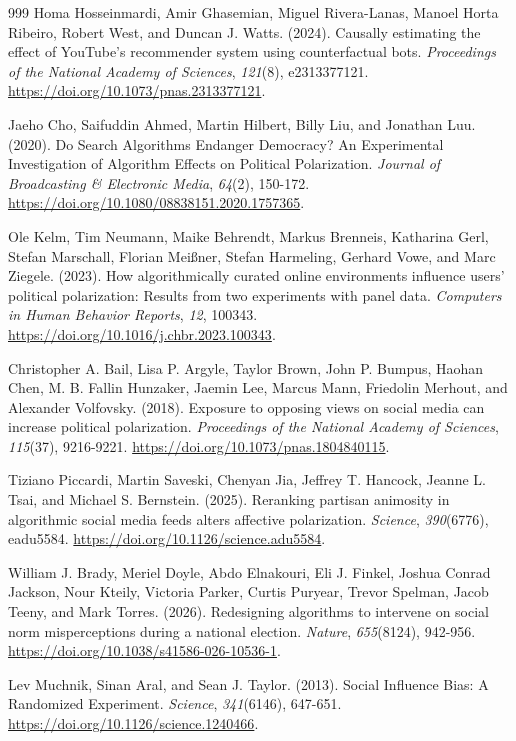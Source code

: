 \begin{thebibliography}{999}
Homa Hosseinmardi, Amir Ghasemian, Miguel Rivera-Lanas, Manoel Horta Ribeiro, Robert West, and Duncan J. Watts. (2024). Causally estimating the effect of YouTube's recommender system using counterfactual bots. \textit{Proceedings of the National Academy of Sciences}, \textit{121}(8), e2313377121. \url{https://doi.org/10.1073/pnas.2313377121}.

Jaeho Cho, Saifuddin Ahmed, Martin Hilbert, Billy Liu, and Jonathan Luu. (2020). Do Search Algorithms Endanger Democracy? An Experimental Investigation of Algorithm Effects on Political Polarization. \textit{Journal of Broadcasting \& Electronic Media}, \textit{64}(2), 150-172. \url{https://doi.org/10.1080/08838151.2020.1757365}.

Ole Kelm, Tim Neumann, Maike Behrendt, Markus Brenneis, Katharina Gerl, Stefan Marschall, Florian Mei{\ss}ner, Stefan Harmeling, Gerhard Vowe, and Marc Ziegele. (2023). How algorithmically curated online environments influence users' political polarization: Results from two experiments with panel data. \textit{Computers in Human Behavior Reports}, \textit{12}, 100343. \url{https://doi.org/10.1016/j.chbr.2023.100343}.

Christopher A. Bail, Lisa P. Argyle, Taylor Brown, John P. Bumpus, Haohan Chen, M. B. Fallin Hunzaker, Jaemin Lee, Marcus Mann, Friedolin Merhout, and Alexander Volfovsky. (2018). Exposure to opposing views on social media can increase political polarization. \textit{Proceedings of the National Academy of Sciences}, \textit{115}(37), 9216-9221. \url{https://doi.org/10.1073/pnas.1804840115}.

Tiziano Piccardi, Martin Saveski, Chenyan Jia, Jeffrey T. Hancock, Jeanne L. Tsai, and Michael S. Bernstein. (2025). Reranking partisan animosity in algorithmic social media feeds alters affective polarization. \textit{Science}, \textit{390}(6776), eadu5584. \url{https://doi.org/10.1126/science.adu5584}.

William J. Brady, Meriel Doyle, Abdo Elnakouri, Eli J. Finkel, Joshua Conrad Jackson, Nour Kteily, Victoria Parker, Curtis Puryear, Trevor Spelman, Jacob Teeny, and Mark Torres. (2026). Redesigning algorithms to intervene on social norm misperceptions during a national election. \textit{Nature}, \textit{655}(8124), 942-956. \url{https://doi.org/10.1038/s41586-026-10536-1}.

Lev Muchnik, Sinan Aral, and Sean J. Taylor. (2013). Social Influence Bias: A Randomized Experiment. \textit{Science}, \textit{341}(6146), 647-651. \url{https://doi.org/10.1126/science.1240466}.


\end{thebibliography}
